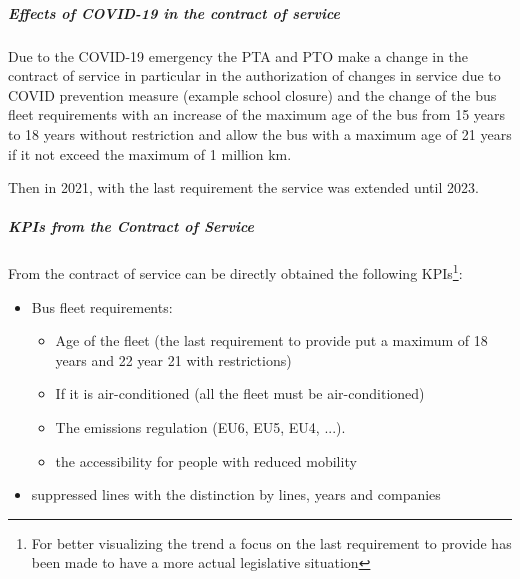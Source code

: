 \subparagraph{Effects of COVID-19 in the contract of service}
Due to the COVID-19 emergency the PTA and PTO make a change in the contract of service in particular in the authorization of changes in service due to COVID prevention measure (example school closure) and the change of the bus fleet requirements with an increase of the maximum age of the bus from 15 years to 18 years without restriction and allow the bus with a maximum age of 21 years if it not exceed the maximum of 1 million km.

Then in 2021, with the last requirement the service was extended until 2023.

\subparagraph{KPIs from the Contract of Service}
From the contract of service can be directly obtained the following KPIs\footnote{For better visualizing the trend a focus on the last requirement to provide has been made to have a more actual legislative situation}:
\begin{itemize}
    \item Bus fleet requirements:
    \begin{itemize}
        \item Age of the fleet (the last requirement to provide put a maximum of 18 years and 22 year 21 with restrictions)
        \item If it is air-conditioned (all the fleet must be air-conditioned)
        \item The emissions regulation (EU6, EU5, EU4, ...).
        \item the accessibility for people with reduced mobility
    \end{itemize}
    \item suppressed lines with the distinction by lines, years and companies
\end{itemize}

